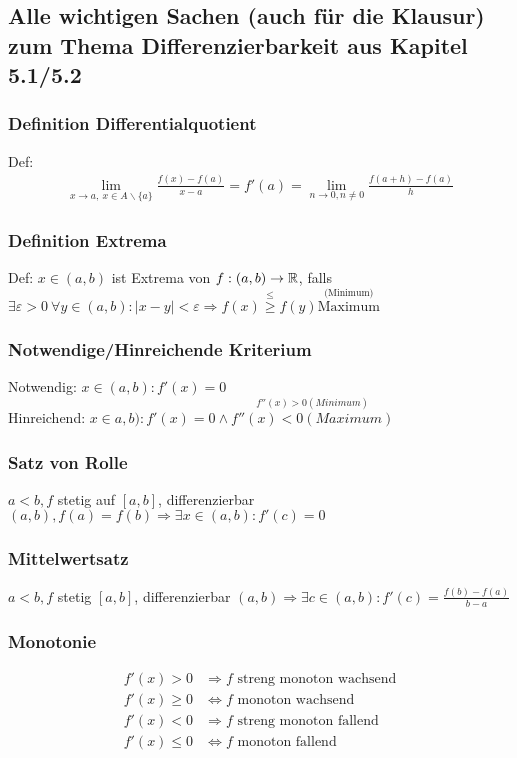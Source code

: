 \subsection{Alle wichtigen Sachen (auch für die Klausur) zum Thema Differenzierbarkeit aus Kapitel 5.1/5.2}
\subsubsection{Definition Differentialquotient}
Def:
\begin{align*}
    \underset{x\rightarrow a,\:x \in A\backslash \{a\}}{\lim} \frac{f(x) - f(a)}{x - a} = f'(a) = \underset{n \rightarrow 0 , n \neq 0}{\lim} \frac{f(a + h) - f(a)}{h}
\end{align*}

\subsubsection{Definition Extrema}
Def: $x \in (a, b)$ ist Extrema von $f: (a, b) \rightarrow \mathbb R$, falls $\exists \varepsilon > 0 \: \forall y \in (a, b): |x - y| < \varepsilon \Rightarrow f(x) \overset{\leq}{\geq} f(y) \overset{\text{(Minimum)}}{\text{Maximum}}$

\subsubsection{Notwendige/Hinreichende Kriterium}
Notwendig: $x \in (a, b) : f'(x) = 0$\\
Hinreichend: $x \in a, b): f'(x) = 0 \land \overset{f''(x) > 0 (Minimum)}{f''(x) < 0 (Maximum)}$

\subsubsection{Satz von Rolle}
$a < b, f$ stetig auf $[a, b]$, differenzierbar $(a, b), f(a) = f(b) \Rightarrow \exists x \in (a, b) : f'(c) = 0$
\subsubsection{Mittelwertsatz}
$a < b, f$ stetig $[a,b]$, differenzierbar $(a,b) \Rightarrow \exists c \in (a, b): f'(c) = \frac{f(b) - f(a)}{b - a}$

\subsubsection{Monotonie}
\begin{align*}
    f'(x) > 0 &\Rightarrow f \text{ streng monoton wachsend}\\
    f'(x) \geq 0 &\Leftrightarrow f \text{ monoton wachsend}\\
    f'(x) < 0 &\Rightarrow f \text{ streng monoton fallend}\\
    f'(x) \leq 0 &\Leftrightarrow f \text{ monoton fallend}\\
\end{align*}
